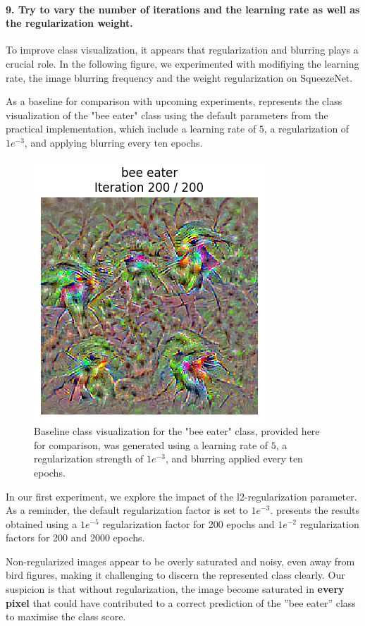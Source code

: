 \paragraph*{9. Try to vary the number of iterations and the learning rate as well as the regularization weight.}
To improve class visualization, it appears that regularization and blurring plays a crucial role. In the following figure, we experimented with modifiying the learning rate, the image blurring frequency and the weight regularization on SqueezeNet.%

As a baseline for comparison with upcoming experiments,  represents the class visualization of the "bee eater" class using the default parameters from the practical implementation, which include a learning rate of $5$, a regularization of $1e^{-3}$, and applying blurring every ten epochs.
\begin{figure}[H]
    \centering
    \includegraphics[width=.35\textwidth]{figs_propre2/SqueezeNet/SqueezeNet_bird_animated_last_frame.png}
    \caption{Baseline class visualization for the "bee eater" class, provided here for comparison, was generated using a learning rate of $5$, a regularization strength of $1e^{-3}$, and blurring applied every ten epochs.}
    \label{fig:class_viz_baseline}
\end{figure}%

In our first experiment, we explore the impact of the l2-regularization parameter. As a reminder, the default regularization factor is set to $1e^{-3}$.  presents the results obtained using a $1e^{-5}$ regularization factor for 200 epochs and $1e^{-2}$ regularization factors for 200 and 2000 epochs.

Non-regularized images appear to be overly saturated and noisy, even away from bird figures, making it challenging to discern the represented class clearly. Our suspicion is that without regularization, the image become saturated in \textbf{every pixel} that could have contributed to a correct prediction of the ''bee eater'' class to maximise the class score.

